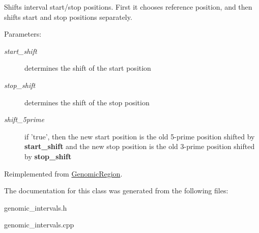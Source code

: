 Shifts interval start/stop positions. First it chooses reference position, and then shifts start and stop positions separately. 

\begin{Desc}
\item[Parameters:]
\begin{description}
\item[{\em start\_\-shift}]determines the shift of the start position \item[{\em stop\_\-shift}]determines the shift of the stop position \item[{\em shift\_\-5prime}]if 'true', then the new start position is the old 5-prime position shifted by {\bf start\_\-shift} and the new stop position is the old 3-prime position shifted by {\bf stop\_\-shift} \end{description}
\end{Desc}


Reimplemented from \hyperlink{classGenomicRegion_dc42fea61283fa8134d65467b2292405}{GenomicRegion}.

The documentation for this class was generated from the following files:\begin{CompactItemize}
\item 
genomic\_\-intervals.h\item 
genomic\_\-intervals.cpp\end{CompactItemize}
